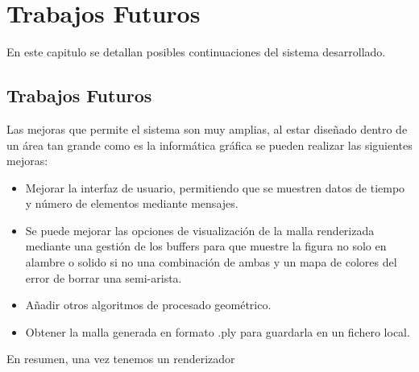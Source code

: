 \chapter{ Trabajos Futuros}

En este capitulo se detallan posibles continuaciones del sistema desarrollado.

\section{ Trabajos Futuros}

Las mejoras que permite el sistema son muy amplias, al estar diseñado dentro de un área tan grande como es la informática gráfica se pueden realizar las siguientes mejoras: 

\begin{itemize}
	\item Mejorar la interfaz de usuario, permitiendo que se muestren datos de tiempo y número de elementos mediante mensajes.
	\item Se puede mejorar las opciones de visualización de la malla renderizada mediante una gestión de los buffers para que muestre la figura no solo en alambre o solido si no una combinación de ambas y un mapa de colores del error de borrar una semi-arista.
	\item Añadir otros algoritmos de procesado geométrico.
	\item Obtener la malla generada en formato .ply para guardarla en un fichero local.
\end{itemize}

En resumen, una vez tenemos un renderizador 